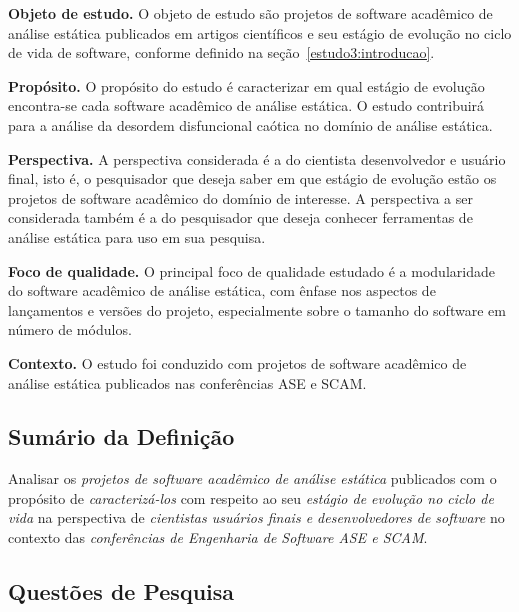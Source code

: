 \begin{description}

  \item{\bf Objeto de estudo.}
    O objeto de estudo são projetos de software acadêmico de análise estática
    publicados em artigos científicos e seu estágio de evolução no ciclo de
    vida de software, conforme definido na seção~\ref{estudo3:introducao}.

  \item{\bf Propósito.}
    O propósito do estudo é caracterizar em qual estágio de evolução
    encontra-se cada software acadêmico de análise estática. O estudo
    contribuirá para a análise da desordem disfuncional caótica no domínio de
    análise estática. 

  \item{\bf Perspectiva.}
    A perspectiva considerada é a do cientista desenvolvedor e usuário final, isto é, o pesquisador
    que deseja saber em que estágio de evolução estão os projetos de software acadêmico do domínio
    de interesse. A perspectiva a ser considerada também é a do pesquisador que deseja
    conhecer ferramentas de análise estática para uso em sua pesquisa.

  \item{\bf Foco de qualidade.}
    O principal foco de qualidade estudado é a modularidade do software
    acadêmico de análise estática, com ênfase nos aspectos de lançamentos e
    versões do projeto, especialmente sobre o tamanho do software em número de
    módulos.

  \item{\bf Contexto.}
    O estudo foi conduzido com projetos de software acadêmico de análise
    estática publicados nas conferências ASE e SCAM.

\end{description}

\subsection{Sumário da Definição}

Analisar os \textit{projetos de software acadêmico de análise estática} publicados
com o propósito de \textit{caracterizá-los}
com respeito ao seu \textit{estágio de evolução no ciclo de vida}
na perspectiva de \textit{cientistas usuários finais e desenvolvedores de software}
no contexto das \textit{conferências de Engenharia de Software ASE e SCAM}.

\subsection{Questões de Pesquisa}

